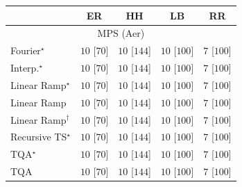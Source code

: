 \begin{tabular}{l|cccc|}
\toprule
            & ER & HH & LB & RR \\
\midrule
\multicolumn{5}{c}{\rule{0pt}{8pt}MPS (Aer)} \\
\midrule
Fourier$^\star$ & {\cellcolor[HTML]{00441B}} \color[HTML]{F1F1F1} $10$ [$70$] & {\cellcolor[HTML]{00441B}} \color[HTML]{F1F1F1} $10$ [$144$] & {\cellcolor[HTML]{00441B}} \color[HTML]{F1F1F1} $10$ [$100$] & {\cellcolor[HTML]{F7FCF5}} \color[HTML]{000000} $7$ [$100$] \\
Interp.$^\star$ & {\cellcolor[HTML]{00441B}} \color[HTML]{F1F1F1} $10$ [$70$] & {\cellcolor[HTML]{00441B}} \color[HTML]{F1F1F1} $10$ [$144$] & {\cellcolor[HTML]{00441B}} \color[HTML]{F1F1F1} $10$ [$100$] & {\cellcolor[HTML]{F7FCF5}} \color[HTML]{000000} $7$ [$100$] \\
Linear Ramp$^\star$ & {\cellcolor[HTML]{00441B}} \color[HTML]{F1F1F1} $10$ [$70$] & {\cellcolor[HTML]{00441B}} \color[HTML]{F1F1F1} $10$ [$144$] & {\cellcolor[HTML]{00441B}} \color[HTML]{F1F1F1} $10$ [$100$] & {\cellcolor[HTML]{F7FCF5}} \color[HTML]{000000} $7$ [$100$] \\
Linear Ramp & {\cellcolor[HTML]{00441B}} \color[HTML]{F1F1F1} $10$ [$70$] & {\cellcolor[HTML]{00441B}} \color[HTML]{F1F1F1} $10$ [$144$] & {\cellcolor[HTML]{00441B}} \color[HTML]{F1F1F1} $10$ [$100$] & {\cellcolor[HTML]{F7FCF5}} \color[HTML]{000000} $7$ [$100$] \\
Linear Ramp$^\dagger$ & {\cellcolor[HTML]{00441B}} \color[HTML]{F1F1F1} $10$ [$70$] & {\cellcolor[HTML]{00441B}} \color[HTML]{F1F1F1} $10$ [$144$] & {\cellcolor[HTML]{00441B}} \color[HTML]{F1F1F1} $10$ [$100$] & {\cellcolor[HTML]{F7FCF5}} \color[HTML]{000000} $7$ [$100$] \\
Recursive TS$^\star$ & {\cellcolor[HTML]{00441B}} \color[HTML]{F1F1F1} $10$ [$70$] & {\cellcolor[HTML]{00441B}} \color[HTML]{F1F1F1} $10$ [$144$] & {\cellcolor[HTML]{00441B}} \color[HTML]{F1F1F1} $10$ [$100$] & {\cellcolor[HTML]{F7FCF5}} \color[HTML]{000000} $7$ [$100$] \\
TQA$^\star$ & {\cellcolor[HTML]{00441B}} \color[HTML]{F1F1F1} $10$ [$70$] & {\cellcolor[HTML]{00441B}} \color[HTML]{F1F1F1} $10$ [$144$] & {\cellcolor[HTML]{00441B}} \color[HTML]{F1F1F1} $10$ [$100$] & {\cellcolor[HTML]{F7FCF5}} \color[HTML]{000000} $7$ [$100$] \\
TQA & {\cellcolor[HTML]{00441B}} \color[HTML]{F1F1F1} $10$ [$70$] & {\cellcolor[HTML]{00441B}} \color[HTML]{F1F1F1} $10$ [$144$] & {\cellcolor[HTML]{00441B}} \color[HTML]{F1F1F1} $10$ [$100$] & {\cellcolor[HTML]{F7FCF5}} \color[HTML]{000000} $7$ [$100$] \\

\end{tabular}
